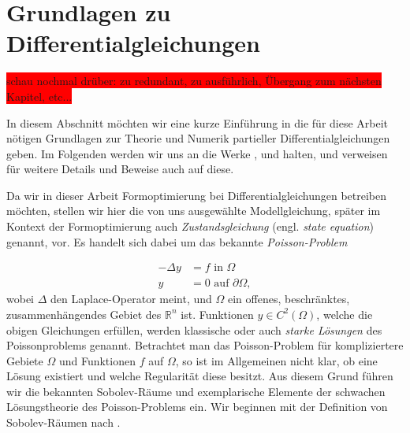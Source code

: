
\section{Grundlagen zu Differentialgleichungen}\label{Chapter_grundlagenpde}



\colorbox{red}{schau nochmal drüber: zu redundant, zu ausführlich, Übergang zum nächsten Kapitel, etc...}

In diesem Abschnitt möchten wir eine kurze Einführung in die für diese Arbeit nötigen Grundlagen zur Theorie und Numerik partieller Differentialgleichungen geben. Im Folgenden werden wir uns an die Werke \cite{PDE1}, \cite{PDE2} und \cite{PDE3} halten, und verweisen für weitere Details und Beweise auch auf diese.

Da wir in dieser Arbeit Formoptimierung bei Differentialgleichungen betreiben möchten, stellen wir hier die von uns ausgewählte Modellgleichung, später im Kontext der Formoptimierung auch \textit{Zustandsgleichung} (engl. \textit{state equation}) genannt, vor. Es handelt sich dabei um das bekannte \textit{Poisson-Problem}

\begin{equation}
\label{Poissonproblem}
	\begin{aligned}
	-\Delta y &=  f  \text{ in } \Omega \; \\ y &= 0 \text{ auf } \partial \Omega,
	\end{aligned}
\end{equation}
wobei $\Delta$ den Laplace-Operator meint, und $\Omega$ ein offenes, beschränktes, zusammenhängendes Gebiet des $\mathbb{R}^n$ ist. Funktionen $y\in C^2(\Omega)$, welche die obigen Gleichungen erfüllen, werden klassische oder auch \textit{starke Lösungen} des Poissonproblems genannt. Betrachtet man das Poisson-Problem für kompliziertere Gebiete $\Omega$ und Funktionen $f$ auf $\Omega$, so ist im Allgemeinen nicht klar, ob eine Lösung existiert und welche Regularität diese besitzt. Aus diesem Grund führen wir die bekannten Sobolev-Räume und exemplarische Elemente der schwachen Lösungstheorie des Poisson-Problems ein. Wir beginnen mit der Definition von Sobolev-Räumen nach \cite{PDE3}.

